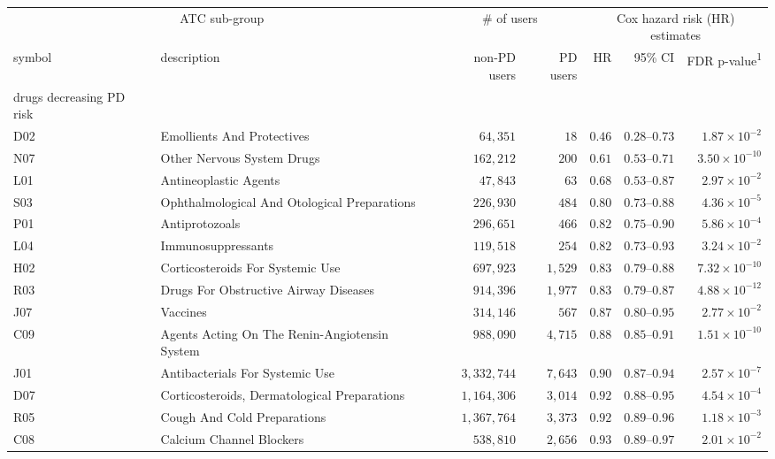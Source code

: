 \captionsetup[table]{labelformat=empty,skip=1pt}
\setlength{\LTpost}{0mm}
\begin{longtable}{llrrrrr}
\toprule
\multicolumn{2}{c}{ATC sub-group} & \multicolumn{2}{c}{\# of users} & \multicolumn{3}{c}{Cox hazard risk (HR) estimates} \\ 
\cmidrule(lr){1-2} \cmidrule(lr){3-4} \cmidrule(lr){5-7}
symbol & description & non-PD users & PD users & HR & 95\% CI & FDR p-value\textsuperscript{1} \\ 
\midrule
\multicolumn{1}{l}{drugs decreasing PD risk} \\ 
\midrule
D02 & Emollients And Protectives & $64,351$ & $18$ & $0.46$ & $0.28$–$0.73$ & $1.87 \times 10^{-2}$ \\ 
N07 & Other Nervous System Drugs & $162,212$ & $200$ & $0.61$ & $0.53$–$0.71$ & $3.50 \times 10^{-10}$ \\ 
L01 & Antineoplastic Agents & $47,843$ & $63$ & $0.68$ & $0.53$–$0.87$ & $2.97 \times 10^{-2}$ \\ 
S03 & Ophthalmological And Otological Preparations & $226,930$ & $484$ & $0.80$ & $0.73$–$0.88$ & $4.36 \times 10^{-5}$ \\ 
P01 & Antiprotozoals & $296,651$ & $466$ & $0.82$ & $0.75$–$0.90$ & $5.86 \times 10^{-4}$ \\ 
L04 & Immunosuppressants & $119,518$ & $254$ & $0.82$ & $0.73$–$0.93$ & $3.24 \times 10^{-2}$ \\ 
H02 & Corticosteroids For Systemic Use & $697,923$ & $1,529$ & $0.83$ & $0.79$–$0.88$ & $7.32 \times 10^{-10}$ \\ 
R03 & Drugs For Obstructive Airway Diseases & $914,396$ & $1,977$ & $0.83$ & $0.79$–$0.87$ & $4.88 \times 10^{-12}$ \\ 
J07 & Vaccines & $314,146$ & $567$ & $0.87$ & $0.80$–$0.95$ & $2.77 \times 10^{-2}$ \\ 
C09 & Agents Acting On The Renin-Angiotensin System & $988,090$ & $4,715$ & $0.88$ & $0.85$–$0.91$ & $1.51 \times 10^{-10}$ \\ 
J01 & Antibacterials For Systemic Use & $3,332,744$ & $7,643$ & $0.90$ & $0.87$–$0.94$ & $2.57 \times 10^{-7}$ \\ 
D07 & Corticosteroids, Dermatological Preparations & $1,164,306$ & $3,014$ & $0.92$ & $0.88$–$0.95$ & $4.54 \times 10^{-4}$ \\ 
R05 & Cough And Cold Preparations & $1,367,764$ & $3,373$ & $0.92$ & $0.89$–$0.96$ & $1.18 \times 10^{-3}$ \\ 
C08 & Calcium Channel Blockers & $538,810$ & $2,656$ & $0.93$ & $0.89$–$0.97$ & $2.01 \times 10^{-2}$ \\ 

\end{longtable}
